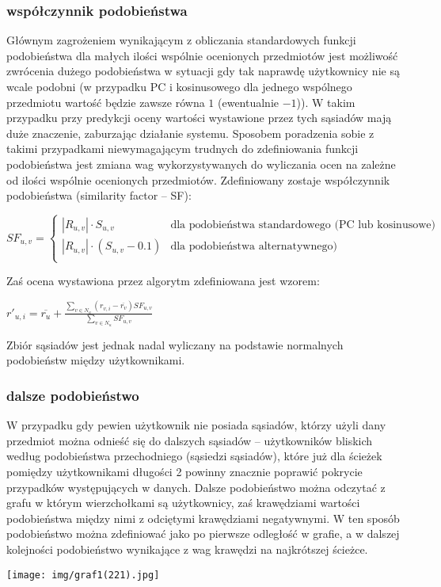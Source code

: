 \documentclass{pracamgr}
\begin{document}
    \subsubsection{współczynnik podobieństwa}
     Głównym zagrożeniem wynikającym z obliczania standardowych funkcji podobieństwa dla małych ilości wspólnie ocenionych przedmiotów jest możliwość
     zwrócenia dużego podobieństwa w sytuacji gdy tak naprawdę użytkownicy nie są wcale podobni
     (w przypadku PC i kosinusowego dla jednego wspólnego przedmiotu wartość będzie zawsze równa $1$ (ewentualnie $-1$)).
     W takim przypadku przy predykcji oceny wartości wystawione przez tych sąsiadów mają duże znaczenie, zaburzając działanie systemu.
     Sposobem poradzenia sobie z takimi przypadkami niewymagającym trudnych do zdefiniowania funkcji podobieństwa jest zmiana wag
     wykorzystywanych do wyliczania ocen na zależne od ilości wspólnie ocenionych przedmiotów.
     Zdefiniowany zostaje współczynnik podobieństwa (similarity factor -- SF):
     \begin{center}
      $SF_{u,v}=\left\{\begin{array}{cc}
       |R_{u,v}|\cdot S_{u,v}&\text{dla podobieństwa standardowego (PC lub kosinusowe)}\\
       |R_{u,v}|\cdot(S_{u,v}-0.1)&\text{dla podobieństwa alternatywnego)}\\
      \end{array}\right.$
     \end{center}
     Zaś ocena wystawiona przez algorytm zdefiniowana jest wzorem:
     \begin{center}
     $r'_{u,i}=\overline{r_{u}}+\frac{\sum\limits_{v\in N_u}(r_{v,i}-\overline{r_v})SF_{u,v}}{\sum\limits_{v\in N_u}SF_{u,v}}$
     \end{center}
     Zbiór sąsiadów jest jednak nadal wyliczany na podstawie normalnych podobieństw między użytkownikami.
    \subsubsection{dalsze podobieństwo}
     W przypadku gdy pewien użytkownik nie posiada sąsiadów, którzy użyli dany przedmiot
     można odnieść się do dalszych sąsiadów -- użytkowników bliskich według podobieństwa przechodniego (sąsiedzi sąsiadów),
     które już dla ścieżek pomiędzy użytkownikami długości 2 powinny znacznie poprawić pokrycie przypadków występujących w danych.
     Dalsze podobieństwo można odczytać z grafu w którym wierzchołkami są użytkownicy, zaś krawędziami wartości podobieństwa między nimi z odciętymi krawędziami
     negatywnymi. W ten sposób podobieństwo można zdefiniować jako po pierwsze odległość w grafie, a w dalszej kolejności podobieństwo wynikające z wag krawędzi
     na najkrótszej ścieżce.
     \begin{center}
      \texttt{[image: img/graf1(221).jpg]}
     \end{center}
\end{document}
